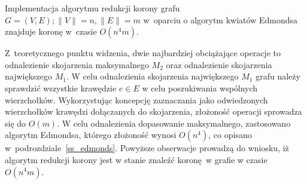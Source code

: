 \begin{theorem}
  Implementacja algorytmu redukcji korony grafu $G=(V,E); \|V\|=n,\|E\|=m$ 
  w~oparciu o algorytm kwiatów Edmondsa znajduje koronę w~czasie $O(n^{4}m)$.
\end{theorem}
\begin{bproof}
  Z~teoretycznego punktu widzenia, dwie najbardziej obciążające operacje to
  odnalezienie skojarzenia maksymalnego $M_2$ oraz odnalezienie skojarzenia
  największego $M_1$.
  W celu odnalezienia skojarzenia największego $M_1$ grafu należy
  sprawdzić wszystkie krawędzie $e\in E$ w celu poszukiwania wspólnych
  wierzchołków.
  Wykorzystując koncepcję zaznaczania jako odwiedzonych wierzchołków krawędzi 
  dołączanych do skojarzenia, złożoność operacji sprowadza się do $O(m)$.
  W celu odnalezienia dopasowanie maksymalnego, zastosowano algorytm Edmondsa,
  którego złożoność wynosi $O(n^{4})$, co
  opisano w~podrozdziale~\ref{ss_edmonds}.
  Powyższe obserwacje prowadzą do wniosku, iż algorytm redukcji korony jest w
  stanie znaleźć koronę w grafie w czasie $O(n^{4}m)$.
\end{bproof}
